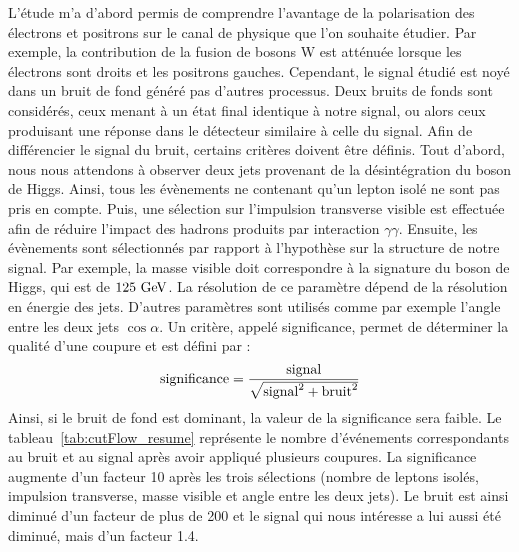   L'étude m'a d'abord permis de comprendre l'avantage de la polarisation des électrons et positrons sur le canal de physique que l'on souhaite étudier.
  Par exemple, la contribution de la fusion de bosons W est atténuée lorsque les électrons sont droits et les positrons gauches.
  Cependant, le signal étudié est noyé dans un bruit de fond généré pas d'autres processus.
  Deux bruits de fonds sont considérés, ceux menant à un état final identique à notre signal, ou alors ceux produisant une réponse dans le détecteur similaire à celle du signal.
  Afin de différencier le signal du bruit, certains critères doivent être définis.
  Tout d'abord, nous nous attendons à observer deux jets provenant de la désintégration du boson de Higgs. 
  Ainsi, tous les évènements ne contenant qu'un lepton isolé ne sont pas pris en compte.
  Puis, une sélection sur l'impulsion transverse visible est effectuée afin de réduire l'impact des hadrons produits par interaction $\gamma\gamma$.
  Ensuite, les évènements sont sélectionnés par rapport à l'hypothèse sur la structure de notre signal.
  Par exemple, la masse visible doit correspondre à la signature du boson de Higgs, qui est de $125~\rm{GeV}$.
  La résolution de ce paramètre dépend de la résolution en énergie des jets. 
  D'autres paramètres sont utilisés comme par exemple l'angle entre les deux jets $\cos{\alpha}$.
  Un critère, appelé significance, permet de déterminer la qualité d'une coupure et est défini par :
  \begin{equation}
    \rm{significance} = \frac{\rm{signal}}{\sqrt{\rm{signal}^2 + \rm{bruit}^2}}
  \end{equation}
  Ainsi, si le bruit de fond est dominant, la valeur de la significance sera faible.
  Le tableau~\ref{tab:cutFlow_resume} représente le nombre d'événements correspondants au bruit et au signal après avoir appliqué plusieurs coupures.
  La significance augmente d'un facteur 10 après les trois sélections (nombre de leptons isolés, impulsion transverse, masse visible et angle entre les deux jets).
  Le bruit est ainsi diminué d'un facteur de plus de 200 et le signal qui nous intéresse a lui aussi été diminué, mais d'un facteur 1.4. 

